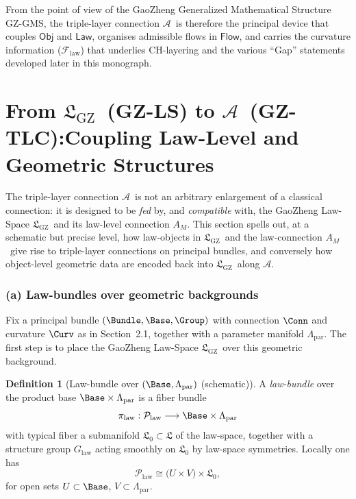 \documentclass[11pt]{book}
\theoremstyle{plain}
\theoremstyle{definition}
\newtheorem{definition}[theorem]{Definition} \theoremstyle{remark}
\newcommand{\GZLStxt}{\textsf{GZ-LS}}   \newcommand{\GZLTtxt}{\textsf{GZ-LT}}   \newcommand{\GZLOCtxt}{\textsf{GZ-LOC}} \newcommand{\GZLCurvtxt}{\textsf{GZ-LCurv}}
\newcommand{\GZLS}{\ensuremath{\mathfrak{L}_{\mathrm{GZ}}}}       \newcommand{\GZLT}{\ensuremath{M_{!w}}}                           \newcommand{\GZLOC}{\ensuremath{A_M}}                             \newcommand{\GZLCurv}{\ensuremath{\mathcal{F}_{\mathrm{law}}}}
\newcommand{\GZTLCtxt}{\textsf{GZ-TLC}}                           \newcommand{\GZTLC}{\ensuremath{\mathcal{A}}}                     \newcommand{\GZGMS}{\textsf{GZ-GMS}}
\begin{document}
From the point of view of the GaoZheng Generalized Mathematical
Structure \GZGMS, the triple-layer connection \GZTLC\ is therefore the
principal device that couples $\mathsf{Obj}$ and $\mathsf{Law}$,
organises admissible flows in $\mathsf{Flow}$, and carries the
curvature information (\GZLCurv) that underlies CH-layering and the
various “Gap” statements developed later in this monograph.



\section[From \GZLStxt\ to \GZTLCtxt: Coupling Law- and Geometric Structures]{From \GZLS\ (\GZLStxt) to \GZTLC\ (\GZTLCtxt):Coupling Law-Level and Geometric Structures}


The triple-layer connection \GZTLC\ is not an arbitrary enlargement of a
classical connection: it is designed to be \emph{fed} by, and
\emph{compatible} with, the GaoZheng Law-Space \GZLS\ and its law-level
connection \GZLOC. This section spells out, at a schematic but precise
level, how law-objects in \GZLS\ and the law-connection \GZLOC\ give
rise to triple-layer connections on principal bundles, and conversely
how object-level geometric data are encoded back into \GZLS\ along
\GZTLC.



\subsubsection*{(a) Law-bundles over geometric backgrounds}

Fix a principal bundle $(\Bundle,\Base,\Group)$ with connection $\Conn$
and curvature $\Curv$ as in Section~2.1, together with a parameter
manifold $\Lambda_{\mathrm{par}}$. The first step is to place the
GaoZheng Law-Space \GZLS\ over this geometric background.

\begin{definition}[Law-bundle over $(\Base,\Lambda_{\mathrm{par}})$ (schematic)]
A \emph{law-bundle} over the product base
  $\Base\times\Lambda_{\mathrm{par}}$ is a fiber bundle
  \[
      \pi_{\mathrm{law}}:\mathcal{P}_{\mathrm{law}}
      \longrightarrow \Base\times\Lambda_{\mathrm{par}}
  \]
  with typical fiber a submanifold $\mathfrak{L}_0\subset\mathfrak{L}$
  of the law-space, together with a structure group
  $G_{\mathrm{law}}$ acting smoothly on $\mathfrak{L}_0$ by law-space
  symmetries. Locally one has
  \[
      \mathcal{P}_{\mathrm{law}}
      \cong
      \bigl(U\times V\bigr)\times \mathfrak{L}_0,
  \]
  for open sets $U\subset\Base$, $V\subset\Lambda_{\mathrm{par}}$.
\end{definition}
\end{document}
